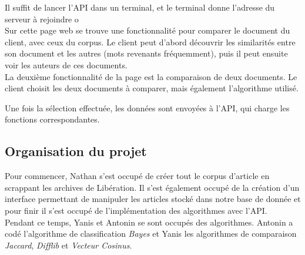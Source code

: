 \documentclass[french,12pt]{article}
\begin{document}
Il suffit de lancer l'API dans un terminal, et le terminal donne l'adresse du serveur à rejoindre o\\

Sur cette page web se trouve une fonctionnalité pour comparer le document du client, avec ceux du corpus. Le client peut d'abord découvrir les similarités entre son document et les autres (mots revenants fréquemment), puis il peut ensuite voir les auteurs de ces documents.\\

La deuxième fonctionnalité  de la page est la comparaison de deux documents. Le client choisit les deux documents à comparer, mais également l'algorithme utilisé.

Une fois la sélection effectuée, les données sont envoyées à l'API, qui charge les fonctions correspondantes.

\subsection{Organisation du projet}

Pour commencer, Nathan s'est occupé de créer tout le corpus d'article en scrappant les archives de Libération. Il s'est également occupé de la création d'un interface permettant de manipuler les articles stocké dans notre base de donnée et pour finir il s'est occupé de l'implémentation des algorithmes avec l'API.\\

Pendant ce temps, Yanis et Antonin se sont occupés des algorithmes. Antonin a codé l'algorithme de classification \textit{Bayes} et Yanis les algorithmes de comparaison \textit{Jaccard}, \textit{Difflib} et  \textit{Vecteur Cosinus}.\\
\end{document}
